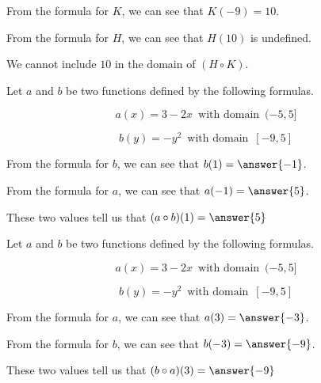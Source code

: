 \documentclass{ximera}
\begin{document}
\begin{example}

From the formula for $K$, we can see that $K(-9) = 10$.

From the formula for $H$, we can see that $H(10)$ is undefined.

We cannot include $10$ in the domain of $(H \circ K)$.

\end{example}










\begin{question}




Let $a$ and $b$ be two functions defined by the following formulas.

\[
a(x) = 3 - 2x \,  \text{ with domain }  \,  (-5, 5]
\]


\[
b(y) = -y^2 \,  \text{ with domain }  \,  [-9, 5]
\]




From the formula for $b$, we can see that $b(1) = \answer{-1}$.

From the formula for $a$, we can see that $a(-1) = \answer{5}$.

These two values tell us that $(a \circ b)(1) = \answer{5}$

\end{question}








\begin{question}




Let $a$ and $b$ be two functions defined by the following formulas.

\[
a(x) = 3 - 2x \,  \text{ with domain }  \,  (-5, 5]
\]


\[
b(y) = -y^2 \,  \text{ with domain }  \,  [-9, 5]
\]





From the formula for $a$, we can see that $a(3) = \answer{-3}$.

From the formula for $b$, we can see that $b(-3) = \answer{-9}$.

These two values tell us that $(b \circ a)(3) = \answer{-9}$

\end{question}
\end{document}
